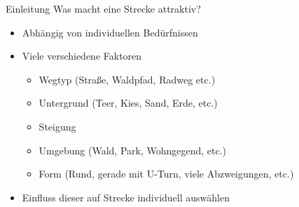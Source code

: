 \documentclass[aspectratio=169,xcolor=dvipsnames, t]{beamer}
\begin{document}
	\begin{frame}{Einleitung}
		\vspace{0.25cm}
		Was macht eine Strecke attraktiv?\\
		\pause
		\vspace{-0.2cm}
		\begin{minipage}[t]{0.48\textwidth}
			\begin{itemize}[<+->]
				\item Abhängig von individuellen Bedürfnissen
				\item Viele verschiedene Faktoren
				\begin{itemize}[<+->]
					\item Wegtyp (Straße, Waldpfad, Radweg etc.)
					\item Untergrund (Teer, Kies, Sand, Erde, etc.)
					\item Steigung
					\item Umgebung (Wald, Park, Wohngegend, etc.)
					\item Form (Rund, gerade mit U-Turn, viele Abzweigungen, etc.)
				\end{itemize}
				\item Einfluss dieser auf Strecke individuell auswählen 
		\end{itemize}
		\end{minipage}
		\begin{minipage}[t][0.7\textheight][b]{0.48\textwidth}
\end{minipage}
\end{frame}
\end{document}

